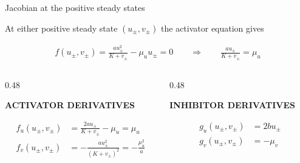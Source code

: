 \begin{frame}{Jacobian at the positive steady states}

  \vspace{-0.26cm}

  {\color{HydraMuted}\fontsize{7.8}{9.6}\selectfont
    At either positive steady state $(u_\pm,v_\pm)$ the activator equation gives
  \par}

  \vspace{-0.30cm}

  {\color{HydraWhite}\fontsize{9.6}{12.1}\selectfont
  \begin{align*}
    f(u_\pm,v_\pm)
    =
    \frac{au_\pm^2}{K+v_\pm}
    -
    \mu_u u_\pm
    =
    0
    \qquad\Rightarrow\qquad
    \frac{au_\pm}{K+v_\pm}
    =
    \mu_u
  \end{align*}
  }

  \vspace{-0.42cm}

  \begin{columns}[T,onlytextwidth]

    \begin{column}{0.48\textwidth}
      {\centering
      {\color{HydraGold}\bfseries\fontsize{7.5}{9}\selectfont
         ACTIVATOR DERIVATIVES\par}
      }

      \vspace{-0.28cm}

      {\color{HydraWhite}\fontsize{8.7}{11}\selectfont
      \begin{align*}
        f_u(u_\pm,v_\pm)
        &=
        \frac{2au_\pm}{K+v_\pm}-\mu_u
        =
        \mu_u
        \\
        f_v(u_\pm,v_\pm)
        &=
        -\frac{au_\pm^2}{(K+v_\pm)^2}
        =
        -\frac{\mu_u^2}{a}
      \end{align*}
      }

    \end{column}

    \begin{column}{0.48\textwidth}
      {\centering
      {\color{HydraCyan}\bfseries\fontsize{7.5}{9}\selectfont
         INHIBITOR DERIVATIVES\par}
         }

      \vspace{-0.28cm}

      {\color{HydraWhite}\fontsize{8.7}{11}\selectfont
      \begin{align*}
        g_u(u_\pm,v_\pm)
        &=
        2bu_\pm
        \\
        g_v(u_\pm,v_\pm)
        &=
        -\mu_v
      \end{align*}
      }


\end{column}
\end{columns}
\end{frame}
